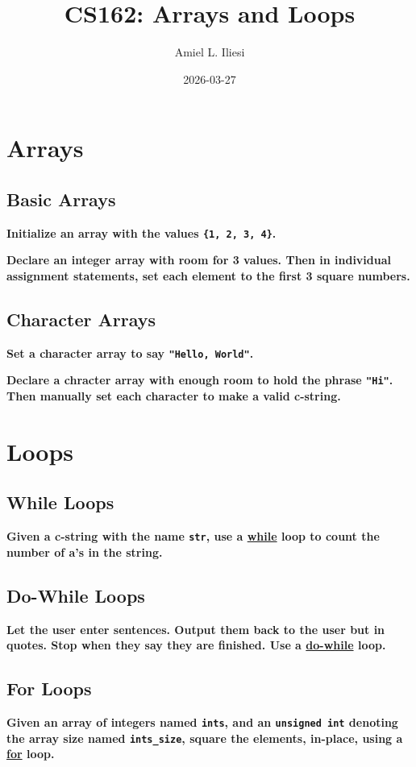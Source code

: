 \documentclass[12pt, letterpaper]{article}
\title{CS162: Arrays and Loops}
\author{Amiel L. Iliesi}
\date{2026-03-27}
\newcommand{\question}[2][4em]{\textbf{#2}\vspace{#1}\par}
\begin{document}
\maketitle

\tableofcontents

\pagebreak
\section{Arrays}

\subsection{Basic Arrays}
\question{Initialize an array with the values \texttt{\{1, 2, 3, 4\}}.}

\question[8em]{Declare an integer array with room for 3 values. Then in individual
assignment statements, set each element to the first 3 square numbers.}

\subsection{Character Arrays}

\question{Set a character array to say \texttt{"Hello, World"}.}

\question[8em]{Declare a chracter array with enough room to hold the phrase
\texttt{"Hi"}. Then manually set each character to make a valid c-string.}

\pagebreak
\section{Loops}

\subsection{While Loops}
\question[6em]{Given a c-string with the name \texttt{str}, use a \uline{while} loop
to count the number of a's in the string.}

\subsection{Do-While Loops}
\question[8em]{Let the user enter sentences. Output them back to the user but in
quotes. Stop when they say they are finished. Use a \uline{do-while} loop.}

\subsection{For Loops}
\question{Given an array of integers named \texttt{ints}, and an
\texttt{unsigned int} denoting the array size named \texttt{ints\_size}, square
the elements, in-place, using a \uline{for} loop.}
\end{document}

